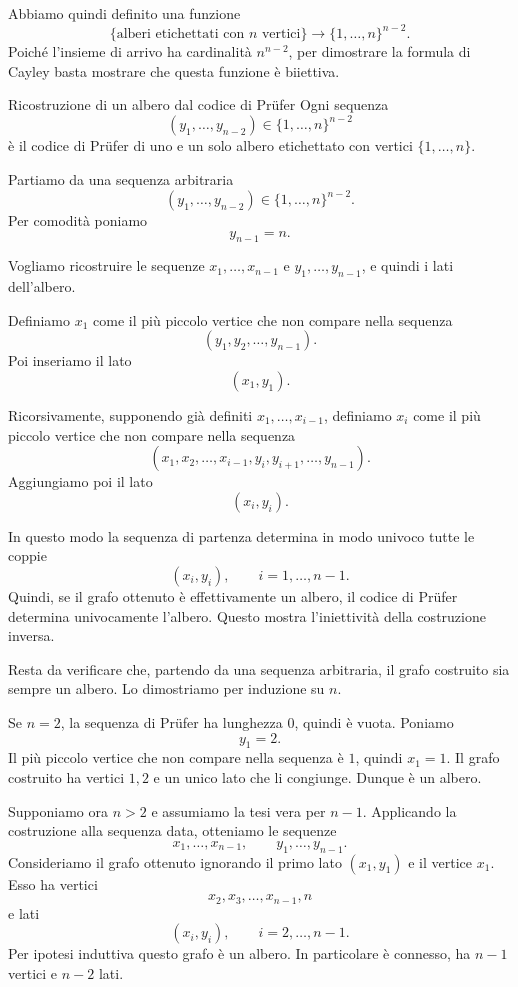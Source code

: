 \documentclass[a4paper]{article}
\begin{document}
Abbiamo quindi definito una funzione
\[
    \{\text{alberi etichettati con }n\text{ vertici}\}
    \longrightarrow
    \{1,\ldots,n\}^{n-2}.
\]
Poiché l'insieme di arrivo ha cardinalità \(n^{n-2}\), per dimostrare la formula di Cayley basta mostrare che questa funzione è biiettiva.

\begin{snippetproposition}{Ricostruzione di un albero dal codice di Prüfer}
    Ogni sequenza
    \[
        (y_1,\ldots,y_{n-2})\in\{1,\ldots,n\}^{n-2}
    \]
    è il codice di Prüfer di uno e un solo albero etichettato con vertici \(\{1,\ldots,n\}\).
\end{snippetproposition}

\begin{snippetproof}{}
    Partiamo da una sequenza arbitraria
    \[
        (y_1,\ldots,y_{n-2})\in\{1,\ldots,n\}^{n-2}.
    \]
    Per comodità poniamo
    \[
        y_{n-1}=n.
    \]

    Vogliamo ricostruire le sequenze \(x_1,\ldots,x_{n-1}\) e \(y_1,\ldots,y_{n-1}\), e quindi i lati dell'albero.

    Definiamo \(x_1\) come il più piccolo vertice che non compare nella sequenza
    \[
        (y_1,y_2,\ldots,y_{n-1}).
    \]
    Poi inseriamo il lato
    \[
        (x_1,y_1).
    \]

    Ricorsivamente, supponendo già definiti \(x_1,\ldots,x_{i-1}\), definiamo \(x_i\) come il più piccolo vertice che non compare nella sequenza
    \[
        (x_1,x_2,\ldots,x_{i-1},y_i,y_{i+1},\ldots,y_{n-1}).
    \]
    Aggiungiamo poi il lato
    \[
        (x_i,y_i).
    \]

    In questo modo la sequenza di partenza determina in modo univoco tutte le coppie
    \[
        (x_i,y_i),
        \qquad
        i=1,\ldots,n-1.
    \]
    Quindi, se il grafo ottenuto è effettivamente un albero, il codice di Prüfer determina univocamente l'albero. Questo mostra l'iniettività della costruzione inversa.

    Resta da verificare che, partendo da una sequenza arbitraria, il grafo costruito sia sempre un albero. Lo dimostriamo per induzione su \(n\).

    Se \(n=2\), la sequenza di Prüfer ha lunghezza \(0\), quindi è vuota. Poniamo
    \[
        y_1=2.
    \]
    Il più piccolo vertice che non compare nella sequenza è \(1\), quindi \(x_1=1\). Il grafo costruito ha vertici \(1,2\) e un unico lato che li congiunge. Dunque è un albero.

    Supponiamo ora \(n>2\) e assumiamo la tesi vera per \(n-1\). Applicando la costruzione alla sequenza data, otteniamo le sequenze
    \[
        x_1,\ldots,x_{n-1},
        \qquad
        y_1,\ldots,y_{n-1}.
    \]
    Consideriamo il grafo ottenuto ignorando il primo lato \((x_1,y_1)\) e il vertice \(x_1\). Esso ha vertici
    \[
        x_2,x_3,\ldots,x_{n-1},n
    \]
    e lati
    \[
        (x_i,y_i),
        \qquad
        i=2,\ldots,n-1.
    \]
    Per ipotesi induttiva questo grafo è un albero. In particolare è connesso, ha \(n-1\) vertici e \(n-2\) lati.


\end{snippetproof}
\end{document}
